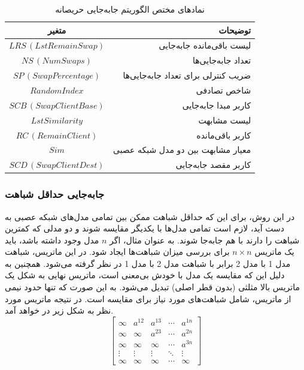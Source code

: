 \begin{table}[h]
	\centering
	\caption{نمادهای مختص الگوریتم جابه‌جایی حریصانه}
	\label{tabel_GreedySwappingNotations}
	\begin{tabular}{cr}
		\hline
		متغیر & توضیحات \\
		\hline
		$LRS \, (LstRemainSwap)$ & لیست باقی‌مانده جابه‌جایی \\
		$NS \, (NumSwaps)$ & تعداد جابه‌جایی‌ها \\
		$SP \, (SwapPercentage)$ & ضریب کنترلی برای تعداد جابه‌جایی‌ها \\
		$RandomIndex$ & شاخص تصادفی \\
		$SCB \, (SwapClientBase)$ & کاربر مبدا جابه‌جایی \\
		$LstSimilarity$ & لیست مشابهت \\
		$RC \, (RemainClient)$ & کاربر باقی‌مانده \\
		$Sim$ & معیار مشابهت بین دو مدل شبکه عصبی \\
		$SCD \, (SwapClientDest)$ & کاربر مقصد جابه‌جایی
	\end{tabular}
\end{table}




\subsubsection{جابه‌جایی حداقل شباهت}

در این روش، برای این که حداقل شباهت ممکن بین تمامی مدل‌های شبکه عصبی به دست آید، لازم است تمامی مدل‌ها با یکدیگر مقایسه شوند و دو مدلی که کمترین شباهت را دارند با هم جابه‌جا شوند. به عنوان مثال، اگر \( n \) مدل وجود داشته باشد، باید یک ماتریس \( n \times n \) برای بررسی میزان شباهت‌ها ایجاد شود. در این ماتریس، شباهت مدل 1 با مدل 2 برابر با شباهت مدل 2 با مدل 1 در نظر گرفته می‌شود. همچنین به دلیل این که مقایسه یک مدل با خودش بی‌معنی است، ماتریس نهایی به شکل یک ماتریس بالا مثلثی%
(بدون قطر اصلی) تبدیل می‌شود. به این صورت که تنها حدود نیمی از ماتریس، شامل شباهت‌های مورد نیاز برای مقایسه است. در نتیجه ماتریس مورد نظر به شکل زیر در خواهد آمد.
\begin{equation}
	\begin{bmatrix}
		\infty & a^{12} & a^{13} & \cdots & a^{1n} \\
		\infty & \infty & a^{23} & \cdots & a^{2n} \\
		\infty & \infty & \infty & \cdots & a^{3n} \\
		\vdots & \vdots & \vdots & \ddots & \vdots \\
		\infty & \infty & \infty & \cdots & \infty
	\end{bmatrix}
	\label{eq_similarity_matrix}
\end{equation}

